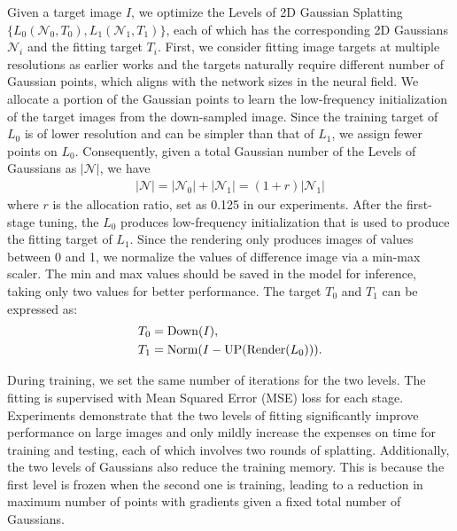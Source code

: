 Given a target image $I$, we optimize the Levels of 2D Gaussian Splatting $\{L_0(\mathcal{N}_0, T_0), L_1(\mathcal{N}_1, T_1)\}$, each of which has the corresponding 2D Gaussians $\mathcal{N}_i$ and the fitting target $T_i$.
First, we consider fitting image targets at multiple resolutions as earlier works and the targets naturally require different number of Gaussian points, which aligns with the network sizes in the neural field. We allocate a portion of the Gaussian points to learn the low-frequency initialization of the target images from the down-sampled image. Since the training target of $L_0$ is of lower resolution and can be simpler than that of $L_1$, we assign fewer points on $L_0$. Consequently, given a total Gaussian number of the Levels of Gaussians as $|\mathcal{N}|$, we have 
\begin{align}
|\mathcal{N}| = |\mathcal{N}_0|+|\mathcal{N}_1| = (1+r)|\mathcal{N}_1|
\end{align} 
where $r$ is the allocation ratio, set as 0.125 in our experiments. After the first-stage tuning, the $L_0$ produces low-frequency initialization that is used to produce the fitting target of $L_1$. Since the rendering only produces images of values between 0 and 1, we normalize the values of difference image via a min-max scaler. The min and max values should be saved in the model for inference, taking only two values for better performance.  The target $T_0$ and $T_1$ can be expressed as:
\begin{align}
T_0 &= {\rm{Down}}(I),\\
T_1 &= {\rm{Norm}}(I-{\rm{UP}}({{\rm{Render}}(L_0)})).
\end{align} 

During training, we set the same number of iterations for the two levels. The fitting is supervised with Mean Squared Error (MSE) loss for each stage. Experiments demonstrate that the two levels of fitting significantly improve performance on large images and only mildly increase the expenses on time for training and testing, each of which involves two rounds of splatting. Additionally, the two levels of Gaussians also reduce the training memory. This is because the first level is frozen when the second one is training, leading to a reduction in maximum number of points with gradients given a fixed total number of Gaussians.


